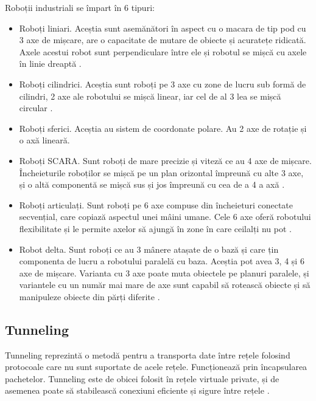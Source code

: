 Roboții industriali se împart în 6 tipuri:
\begin{itemize}
	\item Roboți liniari. Aceștia sunt asemănători în  aspect cu o macara de tip pod cu 3 axe de mișcare, are o capacitate de mutare de obiecte și acuratețe ridicată. Axele acestui robot sunt perpendiculare între ele și robotul se mișcă cu axele în linie dreaptă \cite{ri1}.
	\item Roboți cilindrici. Aceștia sunt roboți pe 3 axe cu zone de lucru sub formă de cilindri, 2 axe ale robotului se mișcă linear, iar cel de al 3 lea se mișcă circular \cite{ri1}.
	\item Roboți sferici. Aceștia au sistem de coordonate polare. Au 2 axe de rotație și o axă lineară.
	\item Roboți SCARA. Sunt roboți de mare precizie și viteză ce au 4 axe de mișcare. Încheieturile roboților se mișcă pe un plan orizontal împreună cu alte 3 axe, și o altă componentă se mișcă sus și jos împreună cu cea de a 4 a axă \cite{ri1}.
	\item Roboți articulați. Sunt roboți pe 6 axe compuse din încheieturi conectate secvențial, care copiază aspectul unei mâini umane. Cele 6 axe oferă robotului flexibilitate și le permite axelor să ajungă în zone în care ceilalți nu pot \cite{ri1}.
	\item Robot delta. Sunt roboți ce au 3 mânere atașate de o bază și care țin componenta de lucru a robotului paralelă cu baza. Aceștia pot avea 3, 4 și 6 axe de mișcare. Varianta cu 3 axe poate muta obiectele pe planuri paralele, și variantele cu un număr mai mare de axe sunt capabil să rotească obiecte și să manipuleze obiecte din părți diferite \cite{ri1}.
\end{itemize}

\subsection{Tunneling}
Tunneling reprezintă o metodă pentru a transporta date între rețele folosind protocoale care nu sunt suportate de acele rețele. Funcționează prin încapsularea pachetelor. Tunneling este de obicei folosit în rețele virtuale private, și de asemenea poate să stabilească conexiuni eficiente și sigure între rețele \cite{Tunneling}.






